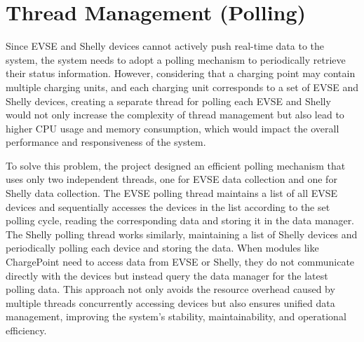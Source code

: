 \documentclass[
	english,
	ruledheaders=section,%
	class=report,%
	thesis={type=Report},%
	accentcolor=9c,%
	custommargins=true,%
	marginpar=false,%
	parskip=half-,%
	fontsize=11pt,%
	logofile={img/tuda_logo.pdf}, %
]{tudapub}
\begin{document}

\section{Thread Management (Polling)}
Since EVSE and Shelly devices cannot actively push real-time data to the system, the system needs to adopt a polling mechanism to periodically retrieve their status information. However, considering that a charging point may contain multiple charging units, and each charging unit corresponds to a set of EVSE and Shelly devices, creating a separate thread for polling each EVSE and Shelly would not only increase the complexity of thread management but also lead to higher CPU usage and memory consumption, which would impact the overall performance and responsiveness of the system. 

To solve this problem, the project designed an efficient polling mechanism that uses only two independent threads, one for EVSE data collection and one for Shelly data collection. The EVSE polling thread maintains a list of all EVSE devices and sequentially accesses the devices in the list according to the set polling cycle, reading the corresponding data and storing it in the data manager. The Shelly polling thread works similarly, maintaining a list of Shelly devices and periodically polling each device and storing the data. When modules like ChargePoint need to access data from EVSE or Shelly, they do not communicate directly with the devices but instead query the data manager for the latest polling data. This approach not only avoids the resource overhead caused by multiple threads concurrently accessing devices but also ensures unified data management, improving the system's stability, maintainability, and operational efficiency.
\end{document}
